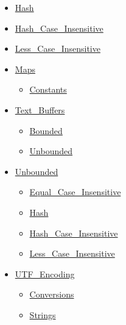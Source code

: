 \begin{multicols*}{\columnnr}
\begin{scriptsize}
\begin{itemize}[leftmargin=0mm]
\begin{itemize}[leftmargin=5mm]
\begin{itemize}[leftmargin=5mm]
\begin{itemize}[leftmargin=5mm]
	  \end{itemize}
	\item[] \href{http://www.ada-auth.org/standards/22rm/html/RM-A-4-9.html}{Hash}
	\item[] \href{http://www.ada-auth.org/standards/22rm/html/RM-A-4-9.html}{Hash\_Case\_Insensitive}
	\item[] \href{http://www.ada-auth.org/standards/22rm/html/RM-A-4-10.html}{Less\_Case\_Insensitive}
	\item[] \href{http://www.ada-auth.org/standards/22rm/html/RM-A-4-2.html}{Maps}
	  \begin{itemize}[leftmargin=5mm]
	  \item[] \href{http://www.ada-auth.org/standards/22rm/html/RM-A-4-6.html}{Constants}
	  \end{itemize}
	\item[] \href{http://www.ada-auth.org/standards/22rm/html/RM-A-4-12.html}{Text\_Buffers}
	  \begin{itemize}[leftmargin=5mm]
	  \item[] \href{http://www.ada-auth.org/standards/22rm/html/RM-A-4-12.html}{Bounded}
	  \item[] \href{http://www.ada-auth.org/standards/22rm/html/RM-A-4-12.html}{Unbounded}
	  \end{itemize}
	\item[] \href{http://www.ada-auth.org/standards/22rm/html/RM-A-4-5.html}{Unbounded}
	  \begin{itemize}[leftmargin=5mm]
	  \item[] \href{http://www.ada-auth.org/standards/22rm/html/RM-A-4-10.html}{Equal\_Case\_Insensitive}
	  \item[] \href{http://www.ada-auth.org/standards/22rm/html/RM-A-4-9.html}{Hash}
	  \item[] \href{http://www.ada-auth.org/standards/22rm/html/RM-A-4-9.html}{Hash\_Case\_Insensitive}
	  \item[] \href{http://www.ada-auth.org/standards/22rm/html/RM-A-4-10.html}{Less\_Case\_Insensitive}
	  \end{itemize}
	\item[] \href{http://www.ada-auth.org/standards/22rm/html/RM-A-4-11.html}{UTF\_Encoding}
	  \begin{itemize}[leftmargin=5mm]
	  \item[] \href{http://www.ada-auth.org/standards/22rm/html/RM-A-4-11.html}{Conversions}
	  \item[] \href{http://www.ada-auth.org/standards/22rm/html/RM-A-4-11.html}{Strings}

\end{itemize}
\end{itemize}
\end{itemize}
\end{itemize}
\end{scriptsize}
\end{multicols*}
